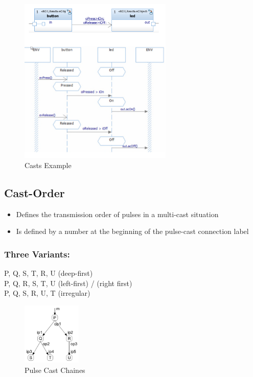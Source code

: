 \begin{figure}[H]
\centering
\includegraphics[width=0.65\textwidth]{figures/castsExample.png}
\caption{Casts Example}
\end{figure}

\hypertarget{cast-order}{%
\subsection{Cast-Order}\label{cast-order}}

\begin{itemize}
\tightlist
\item
  Defines the transmission order of pulses in a multi-cast situation
\item
  Is defined by a number at the beginning of the pulse-cast connection
  label
\end{itemize}

\hypertarget{three-variants}{%
\subsubsection{Three Variants:}\label{three-variants}}

P, Q, S, T, R, U (deep-first)\\
P, Q, R, S, T, U (left-first) / (right first)\\
P, Q, S, R, U, T (irregular)

\begin{figure}[H]
\centering
\includegraphics[width=0.25\textwidth]{figures/pulse-cast-chains.png}
\caption{Pulse Cast Chaines}
\end{figure}

